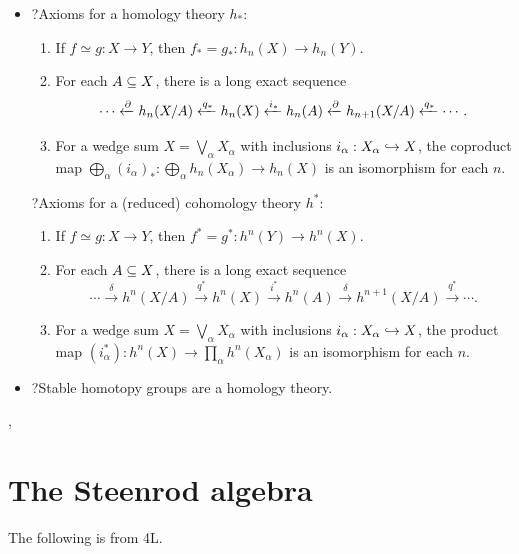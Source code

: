 \documentclass{MetricNotes2023}
\def\subq{\ensuremath\subseteq}
\def\inj{\ensuremath\hookrightarrow}
\def\del{\ensuremath\partial}
\begin{document}
\begin{itemize}
\item ?Axioms for a homology theory \(h_*\):
\begin{enumerate}
\item If \(f\simeq g : X \to Y\), then \(f_*=g_* : h_n(X)\to h_n(Y)\).
\item For each \(A\subq X\), there is a long exact sequence
\[\cdots \xleftarrow{\del}h_n(X/A)\xleftarrow{q_*}h_n(X) \xleftarrow{i_*}h_n(A) \xleftarrow{\del} h_{n+1}(X/A)\xleftarrow{q_*}\cdots.\]
\item For a wedge sum \(X=\bigvee_\alpha X_\alpha\) with inclusions \(i_\alpha : X_\alpha \inj X\), the coproduct map \(\bigoplus_\alpha (i_\alpha)_* : \bigoplus_\alpha h_n(X_\alpha) \to  h_n(X)\) is an isomorphism for each \(n\). 
\end{enumerate}
?Axioms for a (reduced) cohomology theory \(h^*\):
\begin{enumerate}
\item If \(f\simeq g : X \to Y\), then \(f^*=g^* : h^n(Y)\to h^n(X)\).
\item For each \(A\subq X\), there is a long exact sequence
\[\cdots \xrightarrow{\delta}h^n(X/A)\xrightarrow{q^*}h^n(X) \xrightarrow{i^*}h^n(A) \xrightarrow{\delta} h^{n+1}(X/A)\xrightarrow{q^*}\cdots.\]
\item For a wedge sum \(X=\bigvee_\alpha X_\alpha\) with inclusions \(i_\alpha : X_\alpha \inj X\), the product map \((i^*_\alpha) : h^n(X) \to \prod_\alpha h^n(X_\alpha)\) is an isomorphism for each \(n\).
\end{enumerate}
\item ?Stable homotopy groups are a homology theory.
\end{itemize}

\autocite{ass}, \autocite{hatcher}

\section{The Steenrod algebra}\label{2503221247}

The following is from \autocite{hatcher} 4L.
\end{document}

